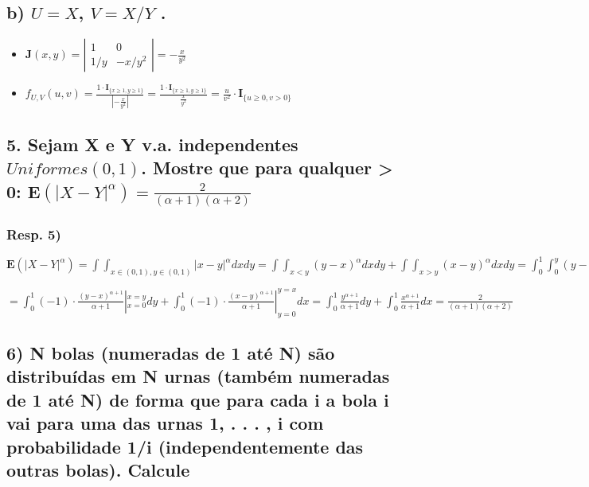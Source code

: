 \documentclass[english]{article}
\DeclareRobustCommand{\greektext}{%
  \fontencoding{LGR}\selectfont\def\encodingdefault{LGR}}
\DeclareRobustCommand{\textgreek}[1]{\leavevmode{\greektext #1}}
\begin{document}
\subsection*{\textmd{b) $U=X$, $V=X/Y$ .}}
\begin{itemize}
\item $\mathbf{J}(x,y)=\left|\begin{array}{cc}
1 & 0\\
1/y & -x/y^{2}
\end{array}\right|=-\frac{x}{y^{2}}$
\item $f_{U,V}(u,v)=\frac{1\cdot\mathbf{I}_{\{x\ge1,y\ge1\}}}{\left|-\frac{x}{y^{2}}\right|}=\frac{1\cdot\mathbf{I}_{\{x\ge1,y\ge1\}}}{\frac{x}{y^{2}}}=\frac{u}{v^{2}}\cdot\mathbf{I}_{\{u\ge0,v>0\}}$
\end{itemize}

\subsection*{\textcompwordmark{}}


\subsection*{\textmd{5. Sejam X e Y v.a. independentes $Uniformes(0,1)$. Mostre
que para qualquer \textgreek{a} > 0: $\mathbf{E}(\left|X-Y\right|^{\alpha})=\frac{2}{(\alpha+1)(\alpha+2)}$}}


\subsubsection*{\textmd{Resp}. \textmd{5)}}

$\mathbf{E}(\left|X-Y\right|^{\alpha})=\int\int_{x\in(0,1),y\in(0,1)}\left|x-y\right|^{\alpha}dxdy=\int\int_{x<y}(y-x)^{\alpha}dxdy+\int\int_{x>y}(x-y)^{\alpha}dxdy=\int_{0}^{1}\int_{0}^{y}(y-x)^{\alpha}dxdy+\int_{0}^{1}\int_{0}^{x}(x-y)^{\alpha}dydx=$

$=\int_{0}^{1}(-1)\cdot\frac{(y-x)^{\alpha+1}}{\alpha+1}|_{x=0}^{x=y}dy+\int_{0}^{1}(-1)\cdot\frac{(x-y)^{\alpha+1}}{\alpha+1}|_{y=0}^{y=x}dx=\int_{0}^{1}\frac{y{}^{\alpha+1}}{\alpha+1}dy+\int_{0}^{1}\frac{x{}^{\alpha+1}}{\alpha+1}dx=\frac{2}{(\alpha+1)(\alpha+2)}$


\subsection*{\textcompwordmark{}}


\subsection*{\textmd{6) N bolas (numeradas de 1 até N) são distribuídas em N urnas
(também numeradas de 1 até N) de forma que para cada i a bola i vai
para uma das urnas 1, . . . , i com probabilidade 1/i (independentemente
das outras bolas). Calcule}}
\end{document}
